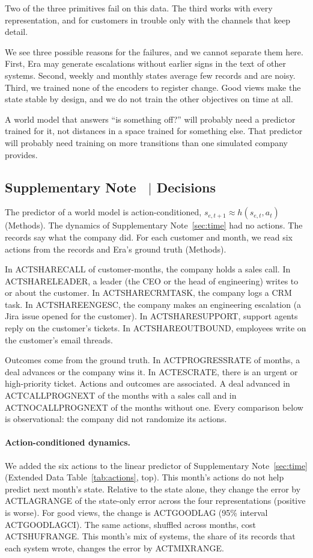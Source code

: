 \documentclass[11pt]{article}
\newcounter{suppnote}
\newcommand{\suppnote}[2]{\refstepcounter{suppnote}\label{#2}\subsection{Supplementary Note \thesuppnote\ $|$ #1}}
\begin{document}
Two of the three primitives fail on this data. The third works with every representation, and for customers in trouble only with the channels that keep detail.

We see three possible reasons for the failures, and we cannot separate them here. First, Era may generate escalations without earlier signs in the text of other systems. Second, weekly and monthly states average few records and are noisy. Third, we trained none of the encoders to register change. Good views make the state stable by design, and we do not train the other objectives on time at all.

A world model that answers ``is something off?'' will probably need a predictor trained for it, not distances in a space trained for something else. That predictor will probably need training on more transitions than one simulated company provides.

\suppnote{Decisions}{sec:decisions}
The predictor of a world model is action-conditioned, $s_{e,t+1} \approx h(s_{e,t}, a_t)$ (Methods). The dynamics of Supplementary Note~\ref{sec:time} had no actions. The records say what the company did. For each customer and month, we read six actions from the records and Era's ground truth (Methods).

In ACTSHARECALL of customer-months, the company holds a sales call. In ACTSHARELEADER, a leader (the CEO or the head of engineering) writes to or about the customer. In ACTSHARECRMTASK, the company logs a CRM task. In ACTSHAREENGESC, the company makes an engineering escalation (a Jira issue opened for the customer). In ACTSHARESUPPORT, support agents reply on the customer's tickets. In ACTSHAREOUTBOUND, employees write on the customer's email threads.

Outcomes come from the ground truth. In ACTPROGRESSRATE of months, a deal advances or the company wins it. In ACTESCRATE, there is an urgent or high-priority ticket. Actions and outcomes are associated. A deal advanced in ACTCALLPROGNEXT of the months with a sales call and in ACTNOCALLPROGNEXT of the months without one. Every comparison below is observational: the company did not randomize its actions.

\paragraph{Action-conditioned dynamics.} We added the six actions to the linear predictor of Supplementary Note~\ref{sec:time} (Extended Data Table~\ref{tab:actions}, top). This month's actions do not help predict next month's state. Relative to the state alone, they change the error by ACTLAGRANGE of the state-only error across the four representations (positive is worse). For good views, the change is ACTGOODLAG (95\% interval ACTGOODLAGCI). The same actions, shuffled across months, cost ACTSHUFRANGE. This month's mix of systems, the share of its records that each system wrote, changes the error by ACTMIXRANGE.
\end{document}
